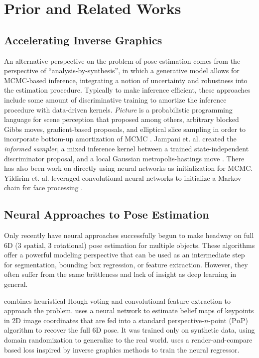 \section{Prior and Related Works}

  \subsection{Accelerating Inverse Graphics}

    An alternative perspective on the problem of pose estimation comes from the
    perspective of ``analysis-by-synthesis'', in which a generative model
    allows for MCMC-based inference, integrating a notion of uncertainty and
    robustness into the estimation procedure. Typically to make inference
    efficient, these approaches include some amount of discriminative training
    to amortize the inference procedure with data-driven kernels.
    \textit{Picture} is a probabilistic programming language for scene
    perception that proposed among others, arbitrary blocked Gibbs moves,
    gradient-based proposals, and elliptical slice sampling in order to
    incorporate bottom-up amortization of MCMC \cite{kulkarni2015picture}.
    Jampani et. al. created the \textit{informed sampler}, a mixed inference
    kernel between a trained state-independent discriminator proposal, and a
    local Gaussian metropolis-hastings move \cite{DBLP:journals/corr/JampaniNLG14}.
    There has also been work on directly using neural networks as
    initialization for MCMC. Yildirim et. al. leveraged convolutional neural
    networks to initialize a Markov chain for face processing
    \cite{yildirim2015efficient}. 

  \subsection{Neural Approaches to Pose Estimation}

    Only recently have neural approaches successfully begun to make headway on
    full 6D (3 spatial, 3 rotational) pose estimation for multiple objects.
    These algorithms offer a powerful modeling perspective that can be used as
    an intermediate step for segmentation, bounding box regression, or feature
    extraction. However, they often suffer from the same brittleness and
    lack of insight as deep learning in general.

    \cite{xiang2017posecnn} combines heuristical Hough voting and convolutional
    feature extraction to approach the problem. \cite{DBLP:journals/corr/abs-1809-10790}
    uses a neural network to estimate belief maps of keypoints in 2D image
    coordinates that are fed into a standard perspective-$n$-point (P$n$P)
    algorithm to recover the full 6D pose. It was trained only on synthetic
    data, using domain randomization to generalize to the real world.
    \cite{kundu20183d} uses a render-and-compare based loss inspired by inverse
    graphics methods to train the neural regressor.


